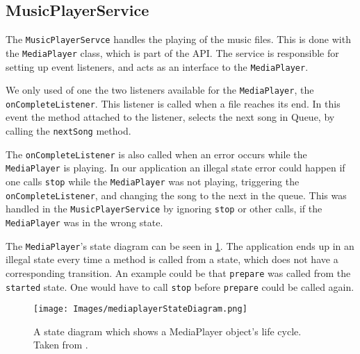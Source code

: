 \subsection{MusicPlayerService} 
The \texttt{MusicPlayerServce} handles the playing of the music files. This is done with the \texttt{MediaPlayer} class, which is part of the \citet{android:MediaPlayer} API. The service is responsible for setting up event listeners, and acts as an interface to the \texttt{MediaPlayer}.  

We only used of one the two listeners available for the \texttt{MediaPlayer}, the \texttt{onCompleteListener}. This listener is called when a file reaches its end. In this event the method attached to the listener, selects the next song in Queue, by calling the \texttt{nextSong} method. 

The \texttt{onCompleteListener} is also called when an error occurs while the \texttt{MediaPlayer} is playing. In our application an illegal state error could happen if one calls \texttt{stop} while the \texttt{MediaPlayer} was not playing, triggering the \texttt{onCompleteListener}, and changing the song to the next in the queue. This was handled in the \texttt{MusicPlayerService} by ignoring \texttt{stop} or other calls, if the \texttt{MediaPlayer} was in the wrong state. 

The \texttt{MediaPlayer}'s state diagram can be seen in \cref{fig:medaiPlayerState}. The application ends up in an illegal state every time a method is called from a state, which does not have a corresponding transition. An example could be that \texttt{prepare} was called from the \texttt{started} state. One would have to call \texttt{stop} before \texttt{prepare} could be called again.

\begin{figure}[h!]
  \centering
    \texttt{[image: Images/mediaplayerStateDiagram.png]}
  \caption{A state diagram which shows a MediaPlayer object's life cycle. Taken from \citet{android:MediaPlayer}.}
  \label{fig:medaiPlayerState}
\end{figure}

